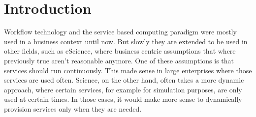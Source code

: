 \chapter{Introduction}

Workflow technology and the service based computing paradigm were mostly used in a business context until now.
But slowly they are extended to be used in other fields, such as eScience, where business centric assumptions that where previously true aren't reasonable anymore.
One of these assumptions is that services should run continuously.
This made sense in large enterprises where those services are used often.
Science, on the other hand, often takes a more dynamic approach, where certain services, for example for simulation purposes, are only used at certain times.
In those cases, it would make more sense to dynamically provision services only when they are needed.



